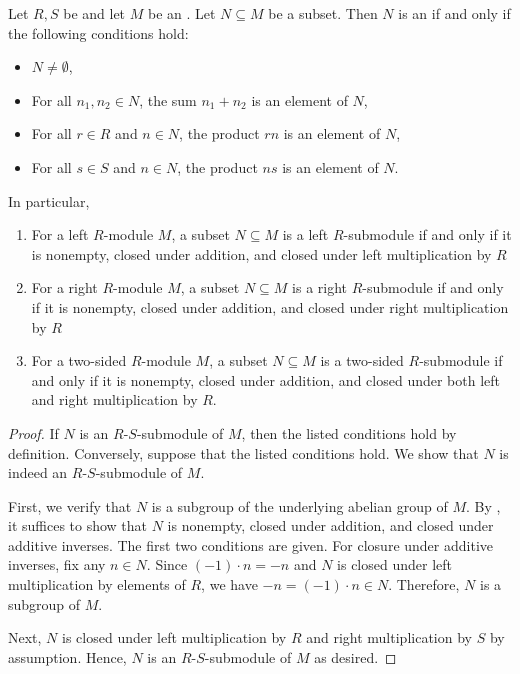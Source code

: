 \begin{proposition} \label{proposition:submodule_criterion_for_a_subset_of_a_module_over_a_ring}
    Let $R,S$ be  and let $M$ be an . Let $N \subseteq M$ be a subset. Then $N$ is an  if and only if the following conditions hold:
    \begin{itemize}
        \item $N \neq \emptyset$,
        \item For all $n_1, n_2 \in N$, the sum $n_1 + n_2$ is an element of $N$,
        \item For all $r \in R$ and $n \in N$, the product $r n$ is an element of $N$,
        \item For all $s \in S$ and $n \in N$, the product $n s$ is an element of $N$.
    \end{itemize}
    In particular, 
    \begin{enumerate}
        \item For a left $R$-module $M$, a subset $N \subseteq M$ is a left $R$-submodule if and only if it is nonempty, closed under addition, and closed under left multiplication by $R$
        \item For a right $R$-module $M$, a subset $N \subseteq M$ is a right $R$-submodule if and only if it is nonempty, closed under addition, and closed under right multiplication by $R$
        \item For a two-sided $R$-module $M$, a subset $N \subseteq M$ is a two-sided $R$-submodule if and only if it is nonempty, closed under addition, and closed under both left and right multiplication by $R$.
    \end{enumerate}
\end{proposition}
\begin{proof}
    If $N$ is an $R$-$S$-submodule of $M$, then the listed conditions hold by definition. Conversely, suppose that the listed conditions hold. We show that $N$ is indeed an $R$-$S$-submodule of $M$.

    First, we verify that $N$ is a subgroup of the underlying abelian group of $M$. By , it suffices to show that $N$ is nonempty, closed under addition, and closed under additive inverses. The first two conditions are given. For closure under additive inverses, fix any $n \in N$. Since $(-1) \cdot n = -n$ and $N$ is closed under left multiplication by elements of $R$, we have $-n = (-1) \cdot n \in N$. Therefore, $N$ is a subgroup of $M$.

    Next, $N$ is closed under left multiplication by $R$ and right multiplication by $S$ by assumption. Hence, $N$ is an $R$-$S$-submodule of $M$ as desired.
\end{proof}